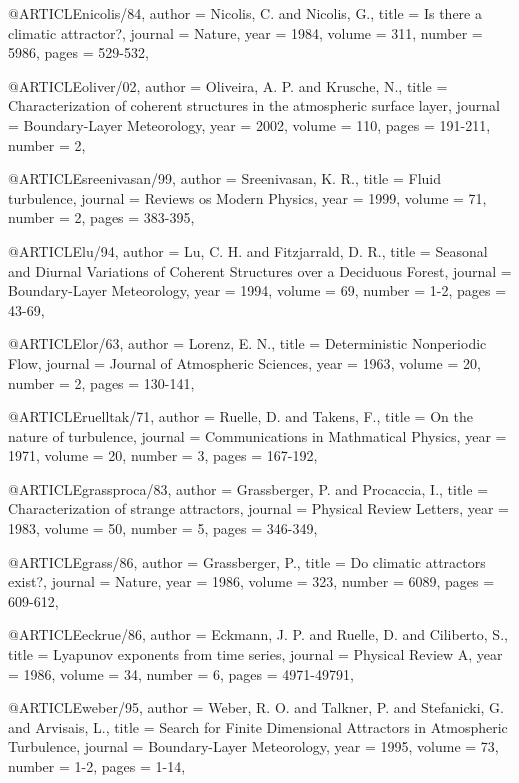 @ARTICLE{nicolis/84,
author 		= {Nicolis, C. and Nicolis, G.},
title		  = {Is there a climatic attractor?},
journal 	= {Nature},
year 			= {1984},
volume 		= {311},
number    = {5986},
pages 		= {529-532},
}

@ARTICLE{oliver/02,
author 		= {Oliveira, A. P. and Krusche, N.},
title		  = {Characterization of coherent structures in the atmospheric surface layer},
journal 	= {Boundary-Layer Meteorology},
year 			= {2002},
volume 		= {110},
pages 		= {191-211},
number    = {2},
}


@ARTICLE{sreenivasan/99,
author 		= {Sreenivasan, K. R.},
title		  = {Fluid turbulence},
journal 	= {Reviews os Modern Physics},
year 			= {1999},
volume 		= {71},
number		= {2},
pages 		= {383-395},
}


@ARTICLE{lu/94,
author 		= {Lu, C. H. and Fitzjarrald, D. R.},
title		  = {Seasonal and Diurnal Variations of Coherent Structures over a Deciduous Forest},
journal 	= {Boundary-Layer Meteorology},
year 			= {1994},
volume 		= {69},
number		= {1-2},
pages 		= {43-69},
}

@ARTICLE{lor/63,
author 		= {Lorenz, E. N.},
title		  = {Deterministic Nonperiodic Flow},
journal 	= {Journal of Atmospheric Sciences},
year 			= {1963},
volume 		= {20},
number    = {2},
pages 		= {130-141},
}

@ARTICLE{ruelltak/71,
author 		= {Ruelle, D. and Takens, F.},
title		  = {On the nature of turbulence},
journal 	= {Communications in Mathmatical Physics},
year 			= {1971},
volume 		= {20},
number    = {3},
pages 		= {167-192},
} 

@ARTICLE{grassproca/83,
author 		= {Grassberger, P. and Procaccia, I.},
title 		= {Characterization of strange attractors},
journal 	= {Physical Review Letters},
year 			= {1983},
volume 		= {50},
number 		= {5},
pages     = {346-349},
}

@ARTICLE{grass/86,
author 		= {Grassberger, P.},
title 		= {Do climatic attractors exist?},
journal 	= {Nature},
year 			= {1986},
volume 		= {323},
number 		= {6089},
pages     = {609-612},
}

@ARTICLE{eckrue/86,
author 		= {Eckmann, J. P. and Ruelle, D. and Ciliberto, S.},
title 		= {Lyapunov exponents from time series},
journal 	= {Physical Review A},
year 			= {1986},
volume 		= {34},
number 		= {6},
pages     = {4971-49791},
}

@ARTICLE{weber/95,
author 	= {Weber, R. O. and Talkner, P. and Stefanicki, G. and Arvisais, L.},
title  	= {Search for Finite Dimensional Attractors in Atmospheric Turbulence},
journal	= {Boundary-Layer Meteorology},
year 		= {1995},
volume 	= {73},
number   = {1-2},
pages    = {1-14},
}


